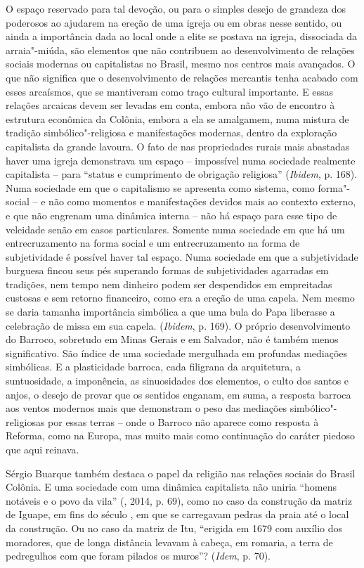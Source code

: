 O espaço reservado para tal devoção, ou para o simples desejo de
grandeza dos poderosos ao ajudarem na ereção de uma igreja ou em obras
nesse sentido, ou ainda a importância dada ao local onde a elite se
postava na igreja, dissociada da arraia"-miúda, são elementos que não
contribuem ao desenvolvimento de relações sociais modernas ou
capitalistas no Brasil, mesmo nos centros mais avançados. O que não
significa que o desenvolvimento de relações mercantis tenha acabado com
esses arcaísmos, que se mantiveram como traço cultural importante. E
essas relações arcaicas devem ser levadas em conta, embora não vão de
encontro à estrutura econômica da Colônia, embora a ela se amalgamem,
numa mistura de tradição simbólico"-religiosa e manifestações modernas,
dentro da exploração capitalista da grande lavoura. O fato de nas
propriedades rurais mais abastadas haver uma igreja demonstrava um
espaço -- impossível numa sociedade realmente capitalista -- para
``status e cumprimento de obrigação religiosa'' (\emph{Ibidem}, p. 168).
Numa sociedade em que o capitalismo se apresenta como sistema, como
forma"-social -- e não como momentos e manifestações devidos mais ao
contexto externo, e que não engrenam uma dinâmica interna -- não há
espaço para esse tipo de veleidade senão em casos particulares. Somente
numa sociedade em que há um entrecruzamento na forma social e um
entrecruzamento na forma de subjetividade é possível haver tal espaço.
Numa sociedade em que a subjetividade burguesa fincou seus pés superando
formas de subjetividades agarradas em tradições, nem tempo nem dinheiro
podem ser despendidos em empreitadas custosas e sem retorno financeiro,
como era a ereção de uma capela. Nem mesmo se daria tamanha importância
simbólica a que uma bula do Papa liberasse a celebração de missa em sua
capela. (\emph{Ibidem}, p. 169). O próprio desenvolvimento do Barroco,
sobretudo em Minas Gerais e em Salvador, não é também menos
significativo. São índice de uma sociedade mergulhada em profundas
mediações simbólicas. E a plasticidade barroca, cada filigrana da
arquitetura, a suntuosidade, a imponência, as sinuosidades dos
elementos, o culto dos santos e anjos, o desejo de provar que os
sentidos enganam, em suma, a resposta barroca aos ventos modernos mais
que demonstram o peso das mediações simbólico"-religiosas por essas
terras -- onde o Barroco não aparece como resposta à Reforma, como na
Europa, mas muito mais como continuação do caráter piedoso que aqui
reinava.

Sérgio Buarque também destaca o papel da religião nas relações sociais
do Brasil Colônia. E uma sociedade com uma dinâmica capitalista
não uniria ``homens notáveis e o povo da vila'' (, 2014, p. 69),
como no caso da construção da matriz de Iguape, em fins do século ,
em que se carregavam pedras da praia até o local da construção. Ou no
caso da matriz de Itu, ``erigida em 1679 com auxílio dos moradores, que
de longa distância levavam à cabeça, em romaria, a terra de pedregulhos
com que foram pilados os muros''? (\emph{Idem}, p. 70).

